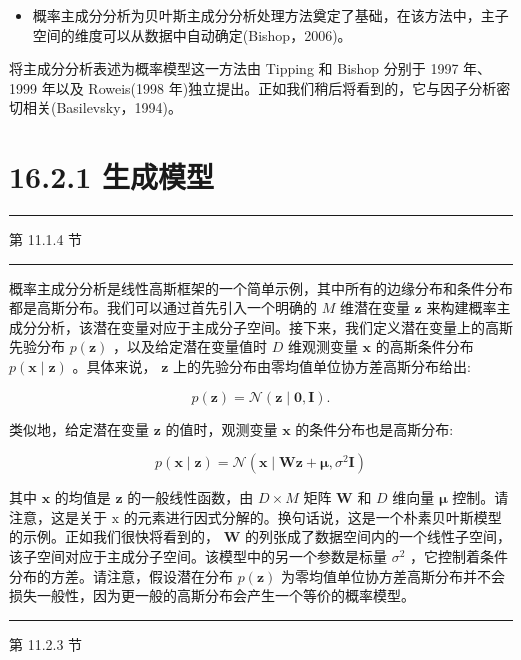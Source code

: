\documentclass[10pt]{article}
\newcommand{\HRule}{\begin{center}\rule{0.9\linewidth}{0.2mm}\end{center}}
\begin{document}
\begin{itemize}
\item 概率主成分分析为贝叶斯主成分分析处理方法奠定了基础，在该方法中，主子空间的维度可以从数据中自动确定(Bishop，2006)。
\end{itemize}

将主成分分析表述为概率模型这一方法由 Tipping 和 Bishop 分别于 1997 年、1999 年以及 Roweis(1998 年)独立提出。正如我们稍后将看到的，它与因子分析密切相关(Basilevsky，1994)。

\section*{16.2.1 生成模型}

\HRule

第 11.1.4 节

\HRule

概率主成分分析是线性高斯框架的一个简单示例，其中所有的边缘分布和条件分布都是高斯分布。我们可以通过首先引入一个明确的 \(M\) 维潜在变量 \(\mathbf{z}\) 来构建概率主成分分析，该潜在变量对应于主成分子空间。接下来，我们定义潜在变量上的高斯先验分布 \(p\left( \mathbf{z}\right)\) ，以及给定潜在变量值时 \(D\) 维观测变量 \(\mathbf{x}\) 的高斯条件分布 \(p\left( {\mathbf{x} \mid  \mathbf{z}}\right)\) 。具体来说， \(\mathbf{z}\) 上的先验分布由零均值单位协方差高斯分布给出:

\[
p\left( \mathbf{z}\right)  = \mathcal{N}\left( {\mathbf{z} \mid  \mathbf{0},\mathbf{I}}\right) . \tag{16.31}
\]

类似地，给定潜在变量 \(\mathbf{z}\) 的值时，观测变量 \(\mathbf{x}\) 的条件分布也是高斯分布:

\[
p\left( {\mathbf{x} \mid  \mathbf{z}}\right)  = \mathcal{N}\left( {\mathbf{x} \mid  \mathbf{W}\mathbf{z} + \mathbf{\mu },{\sigma }^{2}\mathbf{I}}\right)  \tag{16.32}
\]

其中 \(\mathbf{x}\) 的均值是 \(\mathbf{z}\) 的一般线性函数，由 \(D \times  M\) 矩阵 \(\mathbf{W}\) 和 \(D\) 维向量 \(\mathbf{\mu }\) 控制。请注意，这是关于 \(\mathrm{x}\) 的元素进行因式分解的。换句话说，这是一个朴素贝叶斯模型的示例。正如我们很快将看到的， \(\mathbf{W}\) 的列张成了数据空间内的一个线性子空间，该子空间对应于主成分子空间。该模型中的另一个参数是标量 \({\sigma }^{2}\) ，它控制着条件分布的方差。请注意，假设潜在分布 \(p\left( \mathbf{z}\right)\) 为零均值单位协方差高斯分布并不会损失一般性，因为更一般的高斯分布会产生一个等价的概率模型。

\HRule

第 11.2.3 节
\end{document}
